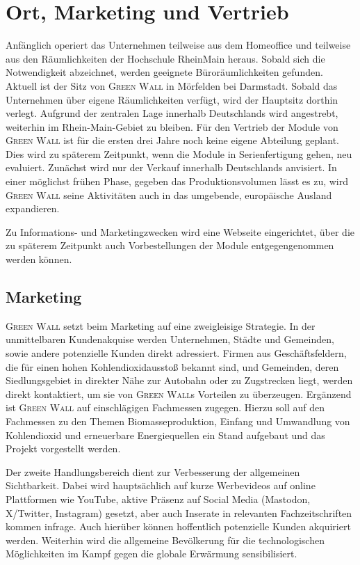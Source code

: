 \chapter{Ort, Marketing und Vertrieb}

Anfänglich operiert das Unternehmen teilweise aus dem Homeoffice und teilweise aus den Räumlichkeiten der Hochschule RheinMain heraus.
Sobald sich die Notwendigkeit abzeichnet, werden geeignete Büroräumlichkeiten gefunden.
Aktuell ist der Sitz von \textsc{Green Wall} in Mörfelden bei Darmstadt.
Sobald das Unternehmen über eigene Räumlichkeiten verfügt, wird der Hauptsitz dorthin verlegt.
Aufgrund der zentralen Lage innerhalb Deutschlands wird angestrebt, weiterhin im Rhein-Main-Gebiet zu bleiben.
Für den Vertrieb der Module von \textsc{Green Wall} ist für die ersten drei Jahre noch keine eigene Abteilung geplant.
Dies wird zu späterem Zeitpunkt, wenn die Module in Serienfertigung gehen, neu evaluiert.
Zunächst wird nur der Verkauf innerhalb Deutschlands anvisiert.
In einer möglichst frühen Phase, gegeben das Produktionsvolumen lässt es zu, wird \textsc{Green Wall} seine Aktivitäten auch in das umgebende, europäische Ausland expandieren.

Zu Informations- und Marketingzwecken wird eine Webseite eingerichtet, über die zu späterem Zeitpunkt auch Vorbestellungen der Module entgegengenommen werden können.

    \section{Marketing}

        \textsc{Green Wall} setzt beim Marketing auf eine zweigleisige Strategie.
        In der unmittelbaren Kundenakquise werden Unternehmen, Städte und Gemeinden, sowie andere potenzielle Kunden direkt adressiert.
        Firmen aus Geschäftsfeldern, die für einen hohen Kohlendioxidausstoß bekannt sind, und Gemeinden, deren Siedlungsgebiet in direkter Nähe zur Autobahn oder zu Zugstrecken liegt, werden direkt kontaktiert, um sie von \textsc{Green Wall}s Vorteilen zu überzeugen.
        Ergänzend ist \textsc{Green Wall} auf einschlägigen Fachmessen zugegen.
        Hierzu soll auf den Fachmessen zu den Themen Biomasseproduktion, Einfang und Umwandlung von Kohlendioxid und erneuerbare Energiequellen ein Stand aufgebaut und das Projekt vorgestellt werden.\par\medskip
        Der zweite Handlungsbereich dient zur Verbesserung der allgemeinen Sichtbarkeit.
        Dabei wird hauptsächlich auf kurze Werbevideos auf online Plattformen wie YouTube, aktive Präsenz auf Social Media (Mastodon, X/Twitter, Instagram) gesetzt, aber auch Inserate in relevanten Fachzeitschriften kommen infrage.
        Auch hierüber können hoffentlich potenzielle Kunden akquiriert werden.
        Weiterhin wird die allgemeine Bevölkerung für die technologischen Möglichkeiten im Kampf gegen die globale Erwärmung sensibilisiert.

